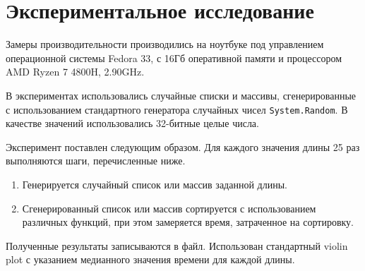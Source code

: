 \section{Экспериментальное исследование}

Замеры производительности производились на ноутбуке под управлением операционной системы Fedora 33, с 16Гб оперативной памяти и процессором AMD Ryzen 7 4800H, 2.90GHz.  

В экспериментах использовались случайные списки и массивы, сгенерированные с использованием стандартного генератора случайных чисел \verb|System.Random|.
В качестве значений использовались 32-битные целые числа.

Эксперимент поставлен следующим образом. 
Для каждого значения длины 25 раз выполняются шаги, перечисленные ниже.
\begin{enumerate}
  \item Генерируется случайный список или массив заданной длины.
  \item Сгенерированный список или массив сортируется с использованием различных функций, при этом замеряется время, затраченное на сортировку.
\end{enumerate}

Полученные результаты записываются в файл.
Использован стандартный violin plot с указанием медианного значения времени для каждой длины.

